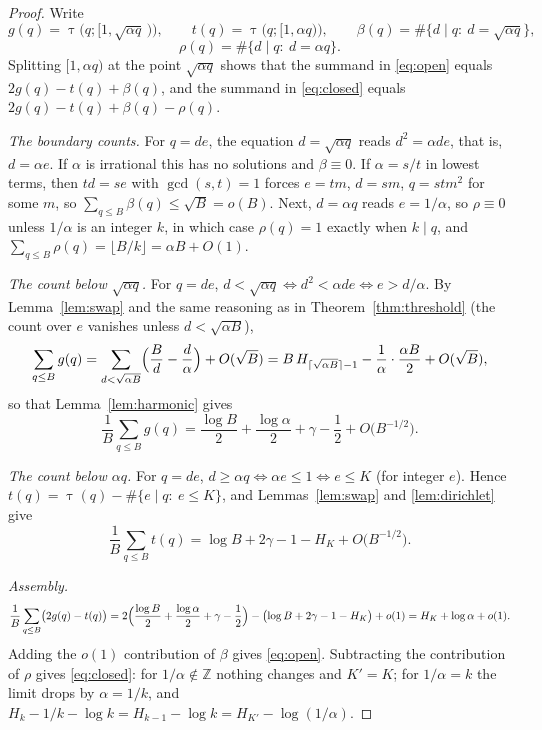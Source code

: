 \documentclass[11pt]{amsart}
\theoremstyle{remark}
\newcommand{\Z}{\mathbb{Z}}
\newcommand{\eul}{\gamma}
\DeclareMathOperator{\divc}{\tau}
\begin{document}
\begin{proof}
Write
\[
g(q)=\divc\bigl(q;[1,\sqrt{\alpha q}\,)\bigr),
\qquad
t(q)=\divc\bigl(q;[1,\alpha q)\bigr),
\qquad
\beta(q)=\#\{d\mid q:\ d=\sqrt{\alpha q}\},
\]
\[
\rho(q)=\#\{d\mid q:\ d=\alpha q\}.
\]
Splitting $[1,\alpha q)$ at the point $\sqrt{\alpha q}$ shows that the
summand in \eqref{eq:open} equals $2g(q)-t(q)+\beta(q)$, and the
summand in \eqref{eq:closed} equals $2g(q)-t(q)+\beta(q)-\rho(q)$.

\smallskip
\emph{The boundary counts.}
For $q=de$, the equation $d=\sqrt{\alpha q}$ reads $d^{2}=\alpha de$,
that is, $d=\alpha e$.  If $\alpha$ is irrational this has no
solutions and $\beta\equiv0$.  If $\alpha=s/t$ in lowest terms, then
$td=se$ with $\gcd(s,t)=1$ forces $e=tm$, $d=sm$, $q=stm^{2}$ for some
$m$, so $\sum_{q\le B}\beta(q)\le\sqrt B=o(B)$.  Next, $d=\alpha q$
reads $e=1/\alpha$, so $\rho\equiv0$ unless $1/\alpha$ is an integer
$k$, in which case $\rho(q)=1$ exactly when $k\mid q$, and
$\sum_{q\le B}\rho(q)=\lfloor B/k\rfloor=\alpha B+O(1)$.

\smallskip
\emph{The count below $\sqrt{\alpha q}$.}
For $q=de$, $d<\sqrt{\alpha q}\iff d^{2}<\alpha de\iff e>d/\alpha$.  By
Lemma~\ref{lem:swap} and the same reasoning as in
Theorem~\ref{thm:threshold} (the count over $e$ vanishes unless
$d<\sqrt{\alpha B}$),
\[
\sum_{q\le B}g(q)
=\sum_{d<\sqrt{\alpha B}}
\Bigl(\frac{B}{d}-\frac{d}{\alpha}\Bigr)+O(\sqrt B)
=B\,H_{\lceil\sqrt{\alpha B}\rceil-1}
-\frac1\alpha\cdot\frac{\alpha B}{2}
+O(\sqrt B),
\]
so that Lemma~\ref{lem:harmonic} gives
\[
\frac1B\sum_{q\le B}g(q)
=\frac{\log B}{2}+\frac{\log\alpha}{2}+\eul-\frac12
+O\bigl(B^{-1/2}\bigr).
\]

\smallskip
\emph{The count below $\alpha q$.}
For $q=de$, $d\ge\alpha q\iff \alpha e\le 1\iff e\le K$ (for integer
$e$).  Hence $t(q)=\divc(q)-\#\{e\mid q:\ e\le K\}$, and
Lemmas~\ref{lem:swap} and \ref{lem:dirichlet} give
\[
\frac1B\sum_{q\le B}t(q)
=\log B+2\eul-1-H_{K}+O\bigl(B^{-1/2}\bigr).
\]

\smallskip
\emph{Assembly.}
\[
\frac1B\sum_{q\le B}\bigl(2g(q)-t(q)\bigr)
=2\Bigl(\frac{\log B}{2}+\frac{\log\alpha}{2}+\eul-\frac12\Bigr)
-\bigl(\log B+2\eul-1-H_{K}\bigr)+o(1)
=H_{K}+\log\alpha+o(1).
\]
Adding the $o(1)$ contribution of $\beta$ gives \eqref{eq:open}.
Subtracting the contribution of $\rho$ gives \eqref{eq:closed}: for
$1/\alpha\notin\Z$ nothing changes and $K'=K$; for $1/\alpha=k$ the
limit drops by $\alpha=1/k$, and
$H_{k}-1/k-\log k=H_{k-1}-\log k=H_{K'}-\log(1/\alpha)$.
\end{proof}
\end{document}

